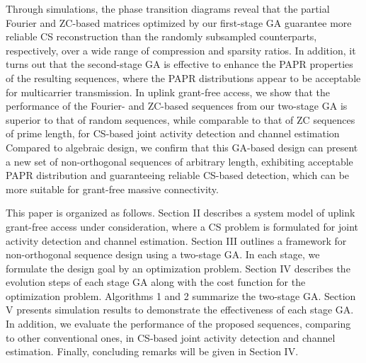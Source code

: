 \documentclass[journal]{IEEEtran}
\newcommand{\Abu}{{\bf A}}
\numberwithin{const2}{const}
\begin{document}
Through simulations, the phase transition diagrams
reveal that the
partial Fourier and ZC-based matrices optimized by our first-stage GA guarantee more reliable CS reconstruction
than the randomly subsampled counterparts, respectively, %
over a wide range of compression and sparsity ratios.
In addition, it turns out that the second-stage GA is effective to enhance
the PAPR properties of the resulting sequences, where %
the PAPR distributions appear to be acceptable for multicarrier transmission.
In uplink grant-free access,
we show that the performance of the Fourier- and ZC-based sequences from our two-stage GA
is superior to that of random sequences, while comparable to that of ZC sequences of prime length,
for CS-based joint activity detection and channel estimation
Compared to algebraic design, we confirm that this GA-based design can present a new set of
non-orthogonal sequences of arbitrary length,
exhibiting acceptable PAPR distribution and 
guaranteeing reliable CS-based detection,
which can be more suitable for %
grant-free massive connectivity.

This paper is organized as follows.
Section II describes a system model of uplink grant-free access under consideration,
where a CS problem is formulated for joint activity detection and channel estimation.
Section III outlines a framework for non-orthogonal sequence design
using a two-stage GA. In each stage, we formulate the design goal by an optimization problem.
Section IV describes the evolution steps of each stage GA 
along with the cost function for the optimization problem.
Algorithms 1 and 2 summarize the two-stage GA.
Section V presents simulation results to demonstrate the effectiveness of each stage GA.
In addition, we evaluate the performance of the proposed sequences, comparing to other conventional ones,
in CS-based joint activity detection and channel estimation. 
Finally, concluding remarks will be given in Section IV.
\end{document}
